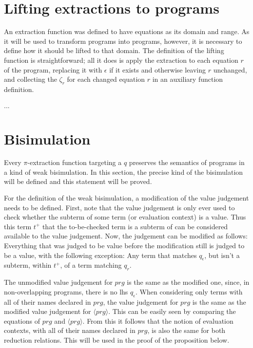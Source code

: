 \section{Lifting extractions to programs}

An extraction function was defined to have equations as its domain and range. As it will be used to transform programs into programs, however, it is necessary to define how it should be lifted to that domain. The definition of the lifting function is straightforward; all it does is apply the extraction to each equation $r$ of the program, replacing it with $\epsilon$ if it exists and otherwise leaving $r$ unchanged, and collecting the $\zeta_r$ for each changed equation $r$ in an auxiliary function definition.

...

\section{Bisimulation}

Every $\pi$-extraction function targeting a $q$ preserves the semantics of programs in a kind of weak bisimulation. In this section, the precise kind of the bisimulation will be defined and this statement will be proved.

For the definition of the weak bisimulation, a modification of the value judgement needs to be defined. First, note that the value judgement is only ever used to check whether the subterm of some term (or evaluation context) is a value. Thus this term $t^+$ that the to-be-checked term is a subterm of can be considered available to the value judgement. Now, the judgement can be modified as follows: Everything that was judged to be value before the modification still is judged to be a value, with the following exception: Any term that matches $q_\epsilon$, but isn't a subterm, within $t^+$, of a term matching $q_r$.

The unmodified value judgement for $prg$ is the same as the modified one, since, in non-overlapping programs, there is no lhs $q_\epsilon$. When considering only terms with all of their names declared in $prg$, the value judgement for $prg$ is the same as the modified value judgement for $\langle prg \rangle$. This can be easily seen by comparing the equations of $prg$ and $\langle prg \rangle$. From this it follows that the notion of evaluation contexts, with all of their names declared in $prg$, is also the same for both reduction relations. This will be used in the proof of the proposition below.

